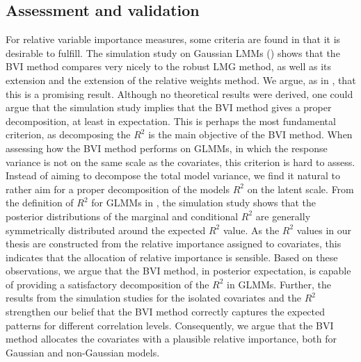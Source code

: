 \subsection*{Assessment and validation}
For relative variable importance measures, some criteria are found in  that it is desirable to fulfill. The simulation study on Gaussian LMMs () shows that the BVI method compares very nicely to the robust LMG method, as well as its extension and the extension of the relative weights method. We argue, as in \citet{Arnstad:Relative_variable_importance_in_Bayesian_linear_mixed_models:2024}, that this is a promising result. Although no theoretical results were derived, one could argue that the simulation study implies that the BVI method gives a proper decomposition, at least in expectation. This is perhaps the most fundamental criterion, as decomposing the $R^2$ is the main objective of the BVI method.
When assessing how the BVI method performs on GLMMs, in which the response variance is not on the same scale as the covariates, this criterion is hard to assess. Instead of aiming to decompose the total model variance, we find it natural to rather aim for a proper decomposition of the models $R^2$ on the latent scale. From the definition of $R^2$ for GLMMs in \citet{nakagawa2013general}, the simulation study shows that the posterior distributions of the marginal and conditional $R^2$ are generally symmetrically distributed around the expected $R^2$ value. As the $R^2$ values in our thesis are constructed from the relative importance assigned to covariates, this indicates that the allocation of relative importance is sensible. Based on these observations, we argue that the BVI method, in posterior expectation, is capable of providing a satisfactory decomposition of the $R^2$ in GLMMs. Further, the results from the simulation studies for the isolated covariates and the $R^2$ strengthen our belief that the BVI method correctly captures the expected patterns for different correlation levels. Consequently, we argue that the BVI method allocates the covariates with a plausible relative importance, both for Gaussian and non-Gaussian models.
